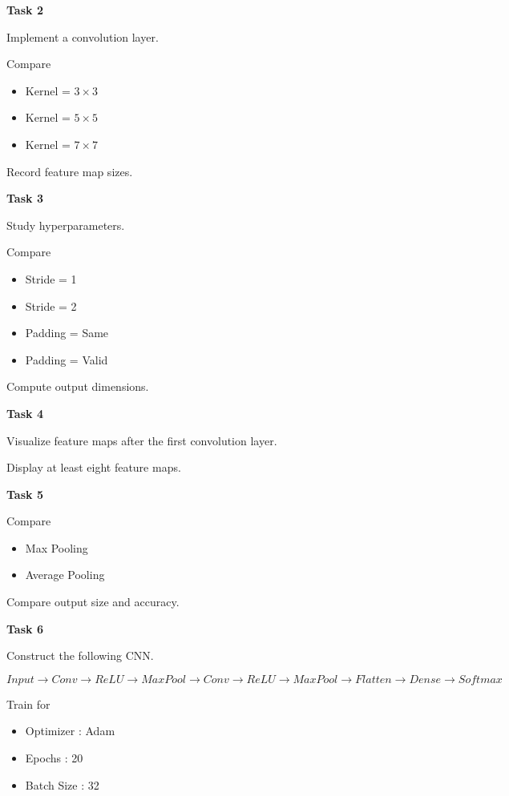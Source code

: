 \documentclass[11pt]{article}
\begin{document}
\textbf{Task 2}

Implement a convolution layer.

Compare

\begin{itemize}
\item Kernel = $3\times3$
\item Kernel = $5\times5$
\item Kernel = $7\times7$
\end{itemize}

Record feature map sizes.

\bigskip

\textbf{Task 3}

Study hyperparameters.

Compare

\begin{itemize}
\item Stride = 1
\item Stride = 2
\item Padding = Same
\item Padding = Valid
\end{itemize}

Compute output dimensions.

\bigskip

\textbf{Task 4}

Visualize feature maps after the first convolution layer.

Display at least eight feature maps.

\bigskip

\textbf{Task 5}

Compare

\begin{itemize}
\item Max Pooling
\item Average Pooling
\end{itemize}

Compare output size and accuracy.

\bigskip

\textbf{Task 6}

Construct the following CNN.

\[
Input
\rightarrow
Conv
\rightarrow
ReLU
\rightarrow
MaxPool
\rightarrow
Conv
\rightarrow
ReLU
\rightarrow
MaxPool
\rightarrow
Flatten
\rightarrow
Dense
\rightarrow
Softmax
\]

Train for

\begin{itemize}
\item Optimizer : Adam
\item Epochs : 20
\item Batch Size : 32
\end{itemize}
\end{document}
